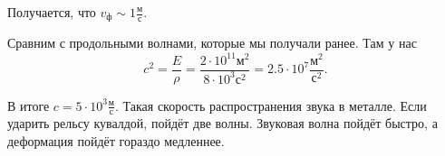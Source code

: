 Получается, что $v_\text{ф} \sim 1\frac{\text{м}}{\text{с}}$.

Сравним с продольными волнами, которые мы получали ранее. Там у нас
\[
  c^2 = \frac E\rho= \frac{2\cdot 10^{11}\text{м}^2}{8\cdot 10^3\text{с}^2} = 2.5\cdot 10^7\frac{\text{м}^2}{\text{с}^2}.
\]

В итоге $c = 5\cdot 10^3\frac{\text{м}}{\text{с}}$. Такая скорость распространения звука в металле. Если ударить рельсу кувалдой, пойдёт две волны. Звуковая волна пойдёт быстро, а деформация пойдёт гораздо медленнее.
